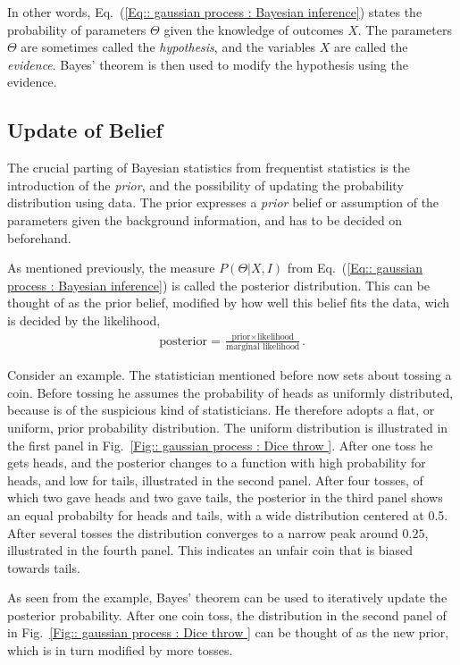 \documentclass[twoside,english]{uiofysmaster}
\begin{document}
{{In other words, Eq.~(\ref{Eq:: gaussian process : Bayesian inference}) states the probability of parameters $\Theta$ given the knowledge of outcomes $X$. The parameters $\Theta$ are sometimes called the \textit{hypothesis}, and the variables $X$ are called the \textit{evidence}. Bayes' theorem is then used to modify the hypothesis using the evidence. 



\subsection{Update of Belief}\label{Sec:: gaussian process : Priors and Likelihood}

The crucial parting of Bayesian statistics from frequentist statistics is the introduction of the \textit{prior}, and the possibility of updating the probability distribution using data. The prior expresses a \textit{prior} belief or assumption of the parameters given the background information, and has to be decided on beforehand. 

As mentioned previously, the measure $P(\Theta | X , I)$ from Eq.~(\ref{Eq:: gaussian process : Bayesian inference}) is called the posterior distribution. This can be thought of as the prior belief, modified by how well this belief fits the data, wich is decided by the likelihood,
\begin{align*}
\text{posterior} = \frac{\text{prior} \times \text{likelihood}}{\text{marginal likelihood}}.
\end{align*}

Consider an example. The statistician mentioned before now sets about tossing a coin. Before tossing he assumes the probability of heads as uniformly distributed, because is of the suspicious kind of statisticians. He therefore adopts a flat, or uniform, prior probability distribution. The uniform distribution is illustrated in the first panel in Fig.~\ref{Fig:: gaussian process : Dice throw }. After one toss he gets heads, and the posterior changes to a function with high probability for heads, and low for tails, illustrated in the second panel. After four tosses, of which two gave heads and two gave tails, the posterior in the third panel shows an equal probabilty for heads and tails, with a wide distribution centered at 0.5. After several tosses the distribution converges to a narrow peak around $0.25$, illustrated in the fourth panel. This indicates an unfair coin that is biased towards tails.

As seen from the example, Bayes' theorem can be used to iteratively update the posterior probability. After one coin toss, the distribution in the second panel of in Fig.~\ref{Fig:: gaussian process : Dice throw } can be thought of as the new prior, which is in turn modified by more tosses.

}}
\end{document}
